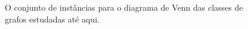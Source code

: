\begin{figure}[htb]
\begin{tabular}{  c c c c  c}
  \end{tabular}
 \caption{O conjunto de instâncias para o diagrama de Venn das classes de grafos estudadas até aqui.}
 \label{fig:exemplosDiagram}
\end{figure}  
 